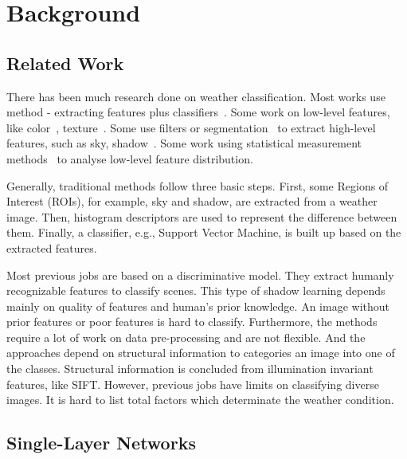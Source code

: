 
\chapter{Background} %
\label{Chapter2}

\section{Related Work}

There has been much research done on weather classification. Most works use method - extracting features plus classifiers~\citep{bishop1995neural,roser2008classification,serrano2002computationally,gokalp2007scene}.
Some work on low-level features, like color~\citep{szummer1998indoor}, texture~\citep{shotton2009textonboost,vailaya2002automatic}. Some use filters or segmentation~\citep{boutell2004learning,shotton2009textonboost} to extract high-level features, such as sky, shadow~\citep{lutwo}. Some work using statistical measurement methods~\citep{he2014spatial,roser2008classification} to analyse low-level feature distribution.

Generally, traditional methods follow three basic steps\citep{roser2008classification,yan2009weather}. First, some Regions of Interest (ROIs), for example, sky and shadow,  are extracted from a weather image. Then, histogram descriptors are used to represent the difference between them. Finally, a classifier, e.g., Support Vector Machine, is built up based on the extracted features. 

Most previous jobs are based on a discriminative model. They extract humanly recognizable features to classify scenes. This type of shadow learning depends mainly on quality of features and human's prior knowledge. An image without prior features or poor features is hard to classify. Furthermore, the methods require a lot of work on data pre-processing and are not flexible. And the approaches depend on structural information to categories an image into one of the classes. Structural information is concluded from illumination invariant features, like SIFT. However, previous jobs have limits on classifying diverse images. It is hard to list total factors which determinate the weather condition.

\section{Single-Layer Networks}

